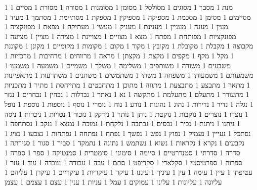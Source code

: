       1 מנת
      1 מסבך
      1 מסוגים
      1 מסולסל
      1 מסומן
      1 מסומנות
      1 מסורה
      1 מסורת
      1 מסיים
      1 מסיימים
      1 מסימן
      1 מסכמת
      1 מספיקה
      1 מספיקין
      1 מספקת
      1 מסתיימת
      1 מסתמך
      1 מעיד
      1 מעין
      1 מענה
      1 מעניין
      1 מענינת
      1 מעניק
      1 מעשי
      1 מעתיקה
      1 מפאת
      1 מפונקציה
      1 מפונקציות
      1 מפותחת
      1 מפתח
      1 מצא
      1 מצויים
      1 מצויינת
      1 מצידה
      1 מציין
      1 מציעה
      1 מקבוצה
      1 מקבלת
      1 מקובלת
      1 מקובץ
      1 מקוד
      1 מקום
      1 מקומות
      1 מקומיים
      1 מקונן
      1 מקוננת
      1 מקל
      1 מקף
      1 מקפים
      1 מקצת
      1 מקצתן
      1 מראה
      1 מרווחים
      1 מרחיבות
      1 מרכזיות
      1 משבעים
      1 משורה
      1 משותפים
      1 משלימה
      1 משלך
      1 משמיים
      1 משמעה
      1 משמעו
      1 משמעותם
      1 משמעותן
      1 משפחה
      1 משתי
      1 משתמשים
      1 משתנים
      1 משתרעות
      1 מתאפיינות
      1 מתאר
      1 מתבצע
      1 מתבצעת
      1 מתווה
      1 מתוכן
      1 מתחבטים
      1 מתייחסת
      1 מתיר
      1 מתכניות
      1 מתעורר
      1 מתעלם
      1 מתעלמת
      1 מתקשה
      1 נא
      1 נאתר
      1 נבדלות
      1 נבחין
      1 נבחרים
      1 נגזר
      1 נגלה
      1 נדיר
      1 נדירות
      1 נהוג
      1 נהוגות
      1 נודע
      1 נוח
      1 נומרי
      1 נוסף
      1 נוספות
      1 נוספת
      1 נופל
      1 נוצרו
      1 נוצרים
      1 נוקבות
      1 נוקטת
      1 נותן
      1 נותר
      1 נזדקק
      1 נזכור
      1 נטויות
      1 ניכרות
      1 ניסה
      1 ניתנו
      1 ניתנת
      1 נכיר
      1 נכסים
      1 נכתבה
      1 נלקחת
      1 נמוכה
      1 נמצא
      1 ננקב
      1 נסתחפה
      1 נסתכל
      1 נעייין
      1 נעמיק
      1 נפוץ
      1 נפש
      1 נפשך
      1 נפתח
      1 נפתחה
      1 נפתחות
      1 נצבעו
      1 נציג
      1 נקבעים
      1 נקרא
      1 נקראות
      1 נשוא
      1 נשתמש
      1 נתונה
      1 נתמקד
      1 סביר
      1 סגור
      1 סגירתה
      1 סדרה
      1 סדרתי
      1 סטנדרטיים
      1 סיימה
      1 סימוני
      1 סימטרית
      1 סמנטיקה
      1 ספר
      1 ספרה
      1 ספרות
      1 ספרטיסטי
      1 סקלארי
      1 סקריפט
      1 סתם
      1 עבה
      1 עבודה
      1 עובדה
      1 עוד
      1 עזר
      1 עטיפתו
      1 עיין
      1 עימה
      1 עין
      1 עיניך
      1 עיננו
      1 עיקר
      1 עיקריות
      1 עיקריים
      1 עיקרן
      1 עליהם
      1 עליונה
      1 עליונות
      1 עלינו
      1 עמוקים
      1 עמל
      1 עניות
      1 ענין
      1 עצם
      1 עצמם
      1 עצמן
